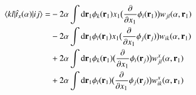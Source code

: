 \documentclass[aip,jcp,reprint,noshowkeys,superscriptaddress]{revtex4-1}
\newcommand{\matelem}[3]{\langle #1 | #2 | #3 \rangle}
\newcommand{\deriv}[3]{\frac{\partial^{#3} #1}{\partial {#2}^{#3}}}
\newcommand{\bri}[1]{{\bf r}_{#1}}
\begin{document}
\begin{equation}
 \begin{aligned}
 \matelem{kl}{\hat{t}_x(\alpha)}{ij} =&  -2 \alpha \int \text{d}\bri{1} \phi_k(\bri{1}) x_1\big( \deriv{}{x_1}{} \phi_i(\bri{1})\big) w_{jl}(\alpha,\bri{1})  \\
                                      &  -2 \alpha \int \text{d}\bri{1} \phi_l(\bri{1}) x_1\big( \deriv{}{x_1}{} \phi_j(\bri{j})\big) w_{ik}(\alpha,\bri{1})  \\
                                      &  +2 \alpha \int \text{d}\bri{1} \phi_k(\bri{1}) \big( \deriv{}{x_1}{} \phi_i(\bri{j})\big) w_{jl}^x(\alpha,\bri{1})  \\
                                      &  +2 \alpha \int \text{d}\bri{1} \phi_l(\bri{1}) \big( \deriv{}{x_1}{} \phi_j(\bri{j})\big) w_{ik}^x(\alpha,\bri{1})  \\
 \end{aligned}
\end{equation}
\end{document}
